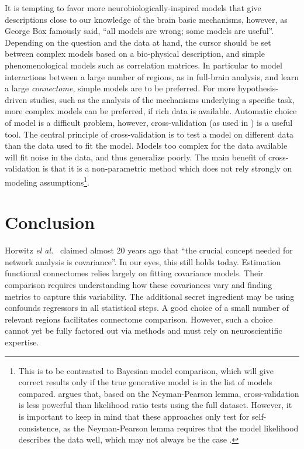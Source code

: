 \documentclass[5p]{elsarticle}
\begin{document}
It is tempting to favor more neurobiologically-inspired models that give
descriptions close to our knowledge of the brain basic mechanisms,
however, as George Box famously said, ``all models are wrong; some models
are useful''. Depending on the question and the data at hand, the cursor
should be set between complex models based on a bio-physical description,
and simple phenomenological models such as correlation matrices. In
particular to model interactions between a large number of regions, as in
full-brain analysis, and learn a large \emph{connectome}, simple models
are to be preferred. For more hypothesis-driven studies, such as the
analysis of the mechanisms underlying a specific task, more complex models
can be preferred, if rich data is available. Automatic choice of model is
a difficult problem, however, cross-validation (as used in
\cite{varoquaux2010c,craddock2012,strother2006}) is a useful tool. The
central principle of cross-validation is to test a model on different
data than the data used to fit the model. Models too complex
for the data available will fit noise in the data, and thus generalize
poorly. The main benefit of cross-validation is that it is a
non-parametric method which does not rely strongly on modeling
assumptions\footnote{This is to be contrasted to Bayesian model
comparison, which will give correct results only if the true generative
model is in the list of models compared. \cite{friston2012} argues that,
based on the Neyman-Pearson lemma, cross-validation is less powerful than
likelihood ratio tests using the full dataset. However, it is
important to keep in mind that these approaches only test for
self-consistence, as the Neyman-Pearson lemma requires that 
the model likelihood describes the data well, which may not always be the
case \cite{lohmann2012}.}.



\section{Conclusion}

Horwitz \emph{el al.}\ \cite{horwitz1995} claimed almost 20 years ago
that ``the crucial concept needed for network analysis is covariance''.
In our eyes, this still holds today. Estimation functional connectomes
relies largely on fitting covariance models. Their comparison requires
understanding how these covariances vary and finding metrics to capture
this variability. The additional secret ingredient may be using  
confounds regressors in all statistical steps. A good choice of a small number of
relevant regions facilitates connectome comparison. However, such a
choice cannot yet be fully factored out via methods and must rely on
neuroscientific expertise.
\end{document}
